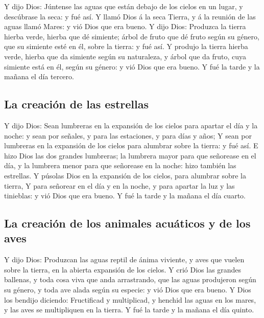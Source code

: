  Y dijo Dios: Júntense las aguas que están debajo de los
cielos en un lugar, y descúbrase la seca: y fué así.  Y
llamó Dios á la seca Tierra, y á la reunión de las aguas llamó Mares: y
vió Dios que era bueno.  Y dijo Dios: Produzca la tierra
hierba verde, hierba que dé simiente; árbol de fruto que dé fruto según
su género, que su simiente esté en él, sobre la tierra: y fué así.
 Y produjo la tierra hierba verde, hierba que da simiente
según su naturaleza, y árbol que da fruto, cuya simiente está en él,
según su género: y vió Dios que era bueno.  Y fué la
tarde y la mañana el día tercero.

\hypertarget{la-creaciuxf3n-de-las-estrellas}{%
\subsection{La creación de las
estrellas}\label{la-creaciuxf3n-de-las-estrellas}}

 Y dijo Dios: Sean lumbreras en la expansión de los
cielos para apartar el día y la noche: y sean por señales, y para las
estaciones, y para días y años;  Y sean por lumbreras en
la expansión de los cielos para alumbrar sobre la tierra: y fué así.
 E hizo Dios las dos grandes lumbreras; la lumbrera mayor
para que señorease en el día, y la lumbrera menor para que señorease en
la noche: hizo también las estrellas.  Y púsolas Dios en
la expansión de los cielos, para alumbrar sobre la tierra,
 Y para señorear en el día y en la noche, y para apartar
la luz y las tinieblas: y vió Dios que era bueno.  Y fué
la tarde y la mañana el día cuarto.

\hypertarget{la-creaciuxf3n-de-los-animales-acuuxe1ticos-y-de-los-aves}{%
\subsection{La creación de los animales acuáticos y de los
aves}\label{la-creaciuxf3n-de-los-animales-acuuxe1ticos-y-de-los-aves}}

 Y dijo Dios: Produzcan las aguas reptil de ánima
viviente, y aves que vuelen sobre la tierra, en la abierta expansión de
los cielos.  Y crió Dios las grandes ballenas, y toda
cosa viva que anda arrastrando, que las aguas produjeron según su
género, y toda ave alada según su especie: y vió Dios que era bueno.
 Y Dios los bendijo diciendo: Fructificad y multiplicad,
y henchid las aguas en los mares, y las aves se multipliquen en la
tierra.  Y fué la tarde y la mañana el día quinto.

